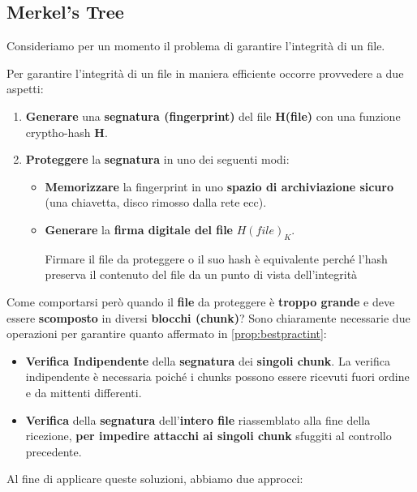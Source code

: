 \subsection{Merkel's Tree}
Consideriamo per un momento il problema di garantire l'integrità di un file. 
\begin{proposition}\label{prop:bestpractint}
Per garantire l'integrità di un file in maniera efficiente occorre provvedere a due aspetti:
\begin{enumerate}
    \item \textbf{Generare} una \textbf{segnatura (fingerprint)} del file \textbf{H(file)} con una funzione cryptho-hash \textbf{H}.
    \item \textbf{Proteggere} la \textbf{segnatura} in uno dei seguenti modi:
    \begin{itemize}
        \item \textbf{Memorizzare} la fingerprint in uno \textbf{spazio di archiviazione sicuro} (una chiavetta, disco rimosso dalla rete ecc).
        \item \textbf{Generare} la \textbf{firma digitale del file} $H(file)_K$.
        \begin{note}
            Firmare il file da proteggere o il suo hash è equivalente perché l'hash preserva il contenuto del file da un punto di vista dell'integrità
        \end{note}
    \end{itemize}
\end{enumerate}
\end{proposition}
Come comportarsi però quando il \textbf{file} da proteggere è \textbf{troppo grande} e deve essere \textbf{scomposto} in diversi \textbf{blocchi (chunk)}? Sono chiaramente necessarie due operazioni per garantire quanto affermato in \cref{prop:bestpractint}:
\begin{itemize}
    \item \textbf{Verifica Indipendente} della \textbf{segnatura} dei \textbf{singoli chunk}. La verifica indipendente è necessaria poiché i chunks possono essere ricevuti fuori ordine e da mittenti differenti.
    \item \textbf{Verifica} della \textbf{segnatura} dell'\textbf{intero file} riassemblato alla fine della ricezione, \textbf{per impedire attacchi ai singoli chunk} sfuggiti al controllo precedente.
\end{itemize}
Al fine di applicare queste soluzioni, abbiamo due approcci:
